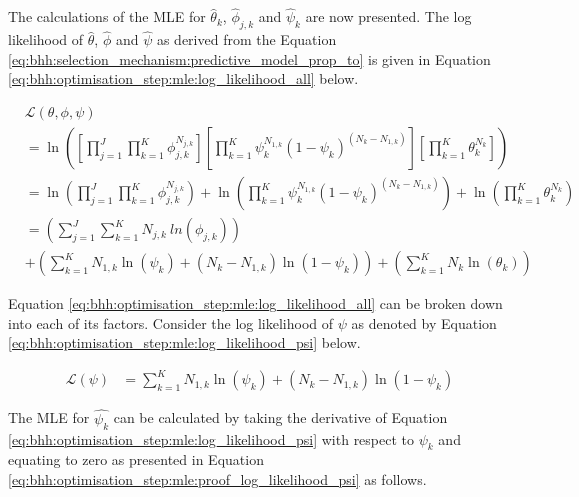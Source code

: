 The calculations of the \ac{MLE} for $\hat{\theta}_{k}$, $\hat{\phi}_{j,k}$ and
$\hat{\psi}_{k}$ are now presented. The log likelihood of $\hat{\theta}$, $\hat{\phi}$ and $\hat{\psi}$ as derived
from the Equation \ref{eq:bhh:selection_mechanism:predictive_model_prop_to} is given in Equation \ref{eq:bhh:optimisation_step:mle:log_likelihood_all} below.

\begin{equation}
      \label{eq:bhh:optimisation_step:mle:log_likelihood_all}
      \begin{split}
            & \mathcal{L}(\theta, \phi, \psi) \\
            &= \ln\left(\left[ \prod_{j=1}^{J} \prod_{k=1}^{K} \phi_{j,k}^{N_{j,k}} \right] \left[ \prod_{k=1}^{K} \psi_{k}^{N_{1,k}} (1 - \psi_{k})^{(N_{k} - N_{1,k})} \right] \left[ \prod_{k=1}^{K} \theta_{k}^{N_{k}} \right] \right) \\
            &= \ln \left( \prod_{j=1}^{J} \prod_{k=1}^{K} \phi_{j,k}^{N_{j,k}} \right) +  \ln \left( \prod_{k=1}^{K} \psi_{k}^{N_{1,k}} (1 - \psi_{k})^{(N_{k} - N_{1,k})} \right) + \ln \left( \prod_{k=1}^{K} \theta_{k}^{N_{k}} \right) \\
            &= \left( \sum_{j=1}^{J} \sum_{k=1}^{K} N_{j,k} \ ln \left( \phi_{j,k}
            \right) \right) \\
            &+ \left( \sum_{k=1}^{K} N_{1,k} \ln \left( \psi_{k} \right) + \left( N_{k} - N_{1,k} \right) \ln \left( 1 - \psi_{k} \right) \right) + \left( \sum_{k=1}^{K} N_{k} \ln \left( \theta_{k} \right) \right)
      \end{split}
\end{equation}

Equation \ref{eq:bhh:optimisation_step:mle:log_likelihood_all} can be broken down into each of its factors. Consider the log likelihood of $\psi$  as denoted by Equation \ref{eq:bhh:optimisation_step:mle:log_likelihood_psi} below.

\begin{equation}
      \label{eq:bhh:optimisation_step:mle:log_likelihood_psi}
      \begin{split}
            \mathcal{L}(\psi) &=  \sum_{k=1}^{K} N_{1,k} \ln \left( \psi_{k} \right) + \left( N_{k} - N_{1,k} \right) \ln \left( 1 - \psi_{k} \right)
      \end{split}
\end{equation}

The MLE for $\hat{\psi_{k}} $ can be calculated by taking the derivative of Equation \ref{eq:bhh:optimisation_step:mle:log_likelihood_psi} with respect to $\psi_{k}$ and equating to zero as presented in Equation \ref{eq:bhh:optimisation_step:mle:proof_log_likelihood_psi} as follows.

